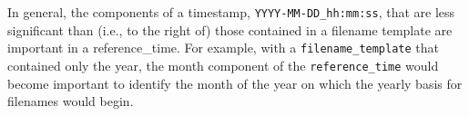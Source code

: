 \vspace{12pt}
 \newline
\hspace*{\mutindent}{\tt type="output"} \newline
\hspace*{\mutindent}{\tt filename\_template="diagnostics.\$Y-\$M.nc"} \newline
\hspace*{\mutindent}{\tt filename\_interval="01-00\_00:00:00"} \newline
\hspace*{\mutindent}{\tt reference\_time="2014-01-01\_00:00:00"} \newline
\hspace*{\mutindent}{\tt precision="single"} \newline
\hspace*{\mutindent}{\tt clobber\_mode="append"} \newline
\hspace*{\mutindent}{\tt output\_interval="6:00:00" >} \newline
\newline
\hspace*{1cm}{\tt <var name="u10"/>} \newline
\hspace*{1cm}{\tt <var name="v10"/>} \newline
\hspace*{1cm}{\tt <var name="t2"/>} \newline
\hspace*{1cm}{\tt <var name="q2"/>} \newline
\newline
{} \newline
\vspace{12pt}

In general, the components of a timestamp, {\tt YYYY-MM-DD\_hh:mm:ss}, that are less significant than (i.e., to the right of) 
those contained in a filename template are important in a reference\_time. For example, with a {\tt filename\_template} that contained
only the year, the month component of the {\tt reference\_time} would become important to identify the month of the year on which
the yearly basis for filenames would begin.


